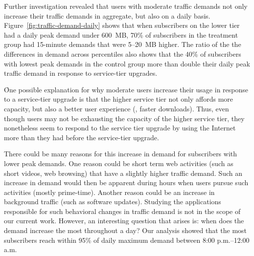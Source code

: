 \f{Further investigation revealed that users with moderate traffic
  demands not only increase their traffic demands in aggregate, but also
  on a daily basis.}  Figure~\ref{fig:traffic-demand-daily} shows that
when subscribers on the lower tier had a daily peak demand under 600~MB,
70\% of subscribers in the treatment group had 15-minute demands that
were 5--20~MB higher.  The ratio of the the differences in demand across
percentiles also shows that the 40\% of subscribers with lowest peak
demands in the control group more than
double their daily peak traffic demand in response to service-tier upgrades.

\f{One possible explanation for why moderate users increase their usage
  in response to a service-tier upgrade is that the higher service tier
  not only affords more capacity, but also a better user experience
  (\eg, faster downloads).  Thus, even though users may not be
  exhausting the capacity of the higher service tier, they nonetheless
  seem to respond to the service tier upgrade by using the Internet more
  than they had before the service-tier upgrade.}


There could be many reasons for this increase in demand for subscribers with
lower peak demands. One reason could be short term web activities (such as short videos,
web browsing) that have a slightly higher traffic demand. Such an increase in demand would
then be apparent during hours when users pursue such activities (mostly prime-time).
Another reason could be an increase in background traffic (such as software updates).
Studying the applications responsible for such behavioral changes in traffic demand is not
in the scope of our current work. However, an interesting question that arises is: when
does the demand increase the most throughout a day? Our analysis showed that the most
subscribers reach within 95\% of daily maximum demand between 8:00 p.m.--12:00 a.m.
\fi

